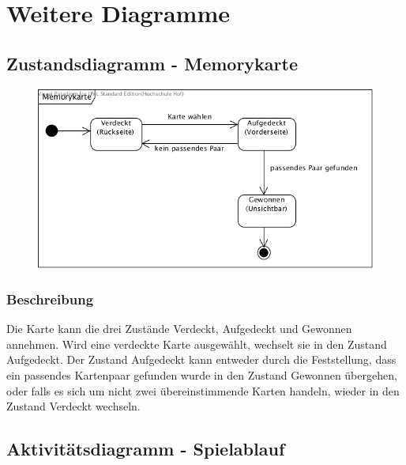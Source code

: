 \clearpage

\chapter{Weitere Diagramme}

\section{Zustandsdiagramm - Memorykarte}

\begin{figure}[!h]
	\centering
    \includegraphics[width=\textwidth]{./ZD_Memorykarte.png}
	\label{layout_gesamt}
\end{figure}
\subsection{Beschreibung}
Die Karte kann die drei Zustände Verdeckt, Aufgedeckt und Gewonnen annehmen. Wird eine verdeckte Karte ausgewählt, wechselt sie in den Zustand Aufgedeckt. Der Zustand Aufgedeckt kann entweder durch die Feststellung, dass ein passendes Kartenpaar gefunden wurde in den Zustand Gewonnen übergehen, oder falls es sich um nicht zwei übereinstimmende Karten handeln, wieder in den Zustand Verdeckt wechseln.


\clearpage
\section{Aktivitätsdiagramm - Spielablauf}

